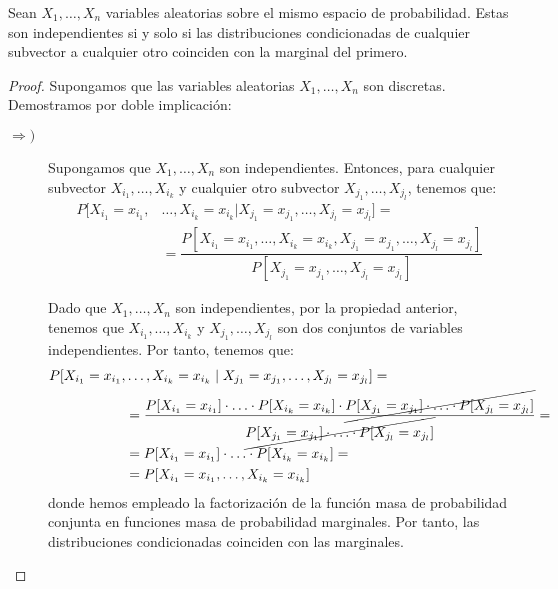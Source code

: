 \begin{coro}
    Sean $X_1, \ldots, X_n$ variables aleatorias sobre el mismo espacio de probabilidad. Estas son independientes si y solo si las distribuciones condicionadas de cualquier subvector a cualquier otro coinciden con la marginal del primero.
\end{coro}
\begin{proof}
    Supongamos que las variables aleatorias $X_1, \ldots, X_n$ son discretas. Demostramos por doble implicación:
    \begin{description}
        \item[$\Longrightarrow)$] Supongamos que $X_1, \ldots, X_n$ son independientes. Entonces, para cualquier subvector $X_{i_1}, \ldots, X_{i_k}$ y cualquier otro subvector $X_{j_1}, \ldots, X_{j_l}$, tenemos que:
        \begin{align*}
            P[X_{i_1} = x_{i_1}, &\ldots, X_{i_k} = x_{i_k} | X_{j_1} = x_{j_1}, \ldots, X_{j_l} = x_{j_l}] =\\&= \dfrac{P[X_{i_1} = x_{i_1}, \ldots, X_{i_k} = x_{i_k}, X_{j_1} = x_{j_1}, \ldots, X_{j_l} = x_{j_l}]}{P[X_{j_1} = x_{j_1}, \ldots, X_{j_l} = x_{j_l}]}
        \end{align*}

        Dado que $X_1, \ldots, X_n$ son independientes, por la propiedad anterior, tenemos que $X_{i_1}, \ldots, X_{i_k}$ y $X_{j_1}, \ldots, X_{j_l}$ son dos conjuntos de variables independientes. Por tanto, tenemos que:
        \begin{align*}
            P[X_{i_1} = x_{i_1}, &\ldots, X_{i_k} = x_{i_k} \mid X_{j_1} = x_{j_1}, \ldots, X_{j_l} = x_{j_l}]
            =\\&=  \dfrac{P[X_{i_1} = x_{i_1}] \cdot \ldots \cdot P[X_{i_k} = x_{i_k}] \cdot \cancel{P[X_{j_1} = x_{j_1}] \cdot \ldots \cdot P[X_{j_l} = x_{j_l}]} }{\cancel{P[X_{j_1} = x_{j_1}] \cdot \ldots \cdot P[X_{j_l} = x_{j_l}]} }
            =\\&= P[X_{i_1} = x_{i_1}] \cdot \ldots \cdot P[X_{i_k} = x_{i_k}]
            =\\&= P[X_{i_1} = x_{i_1}, \ldots, X_{i_k} = x_{i_k}]
        \end{align*}
        donde hemos empleado la factorización de la función masa de probabilidad conjunta en funciones masa de probabilidad marginales. Por tanto, las distribuciones condicionadas coinciden con las marginales.


\end{description}
\end{proof}

